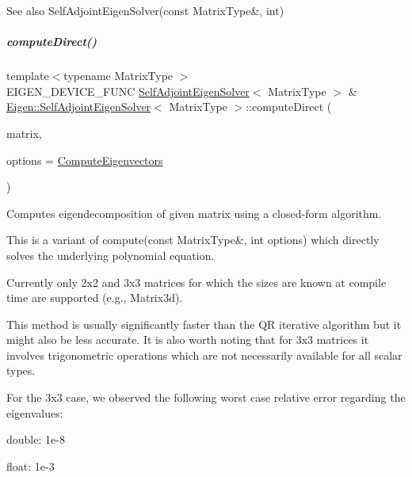 \begin{DoxySeeAlso}{See also}
Self\+Adjoint\+Eigen\+Solver(const Matrix\+Type\&, int) 
\end{DoxySeeAlso}
\mbox{\label{group___eigenvalues___module_a40b0a68841d6176b1ab98743cc82bef4}} 
\subparagraph{\texorpdfstring{compute\+Direct()}{computeDirect()}\hspace{0.1cm}{\footnotesize\ttfamily [1/2]}}
{\footnotesize\ttfamily template$<$typename Matrix\+Type $>$ \\
E\+I\+G\+E\+N\+\_\+\+D\+E\+V\+I\+C\+E\+\_\+\+F\+U\+NC \hyperlink{group___eigenvalues___module_class_eigen_1_1_self_adjoint_eigen_solver}{Self\+Adjoint\+Eigen\+Solver}$<$ Matrix\+Type $>$ \& \hyperlink{group___eigenvalues___module_class_eigen_1_1_self_adjoint_eigen_solver}{Eigen\+::\+Self\+Adjoint\+Eigen\+Solver}$<$ Matrix\+Type $>$\+::compute\+Direct (\begin{DoxyParamCaption}\item[{const Matrix\+Type \&}]{matrix,  }\item[{int}]{options = {\ttfamily \hyperlink{group__enums_ggae3e239fb70022eb8747994cf5d68b4a9ada93d8885bde32b876ba4af01d3292cc}{Compute\+Eigenvectors}} }\end{DoxyParamCaption})}



Computes eigendecomposition of given matrix using a closed-\/form algorithm. 

This is a variant of compute(const Matrix\+Type\&, int options) which directly solves the underlying polynomial equation.

Currently only 2x2 and 3x3 matrices for which the sizes are known at compile time are supported (e.\+g., Matrix3d).

This method is usually significantly faster than the QR iterative algorithm but it might also be less accurate. It is also worth noting that for 3x3 matrices it involves trigonometric operations which are not necessarily available for all scalar types.

For the 3x3 case, we observed the following worst case relative error regarding the eigenvalues\+:
\begin{DoxyItemize}
\item double\+: 1e-\/8
\item float\+: 1e-\/3
\end{DoxyItemize}

